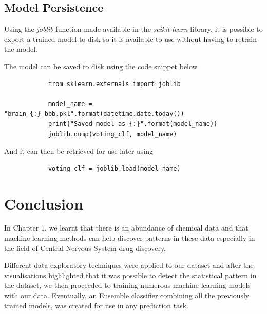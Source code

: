 \documentclass[a4paper,12pt]{report}
\begin{document}
	\section{Model Persistence} 
	Using the \textit{joblib} function made available in the \textit{scikit-learn} library, it is possible to export a trained model to disk so it is available to use without having to retrain the model.
	
	The model can be saved to disk using the code snippet below
		\begin{verbatim}
			from sklearn.externals import joblib

			model_name = "brain_{:}_bbb.pkl".format(datetime.date.today())
			print("Saved model as {:}".format(model_name))
			joblib.dump(voting_clf, model_name) 
		\end{verbatim}
	And it can then be retrieved for use later using
		\begin{verbatim}
			voting_clf = joblib.load(model_name)
		\end{verbatim}
		


\chapter{Conclusion}
	In Chapter 1, we learnt that there is an abundance of chemical data and that machine learning methods can help discover patterns in these data especially in the field of Central Nervous System drug discovery.
	
	Different data exploratory techniques were applied to our dataset and after the visualisations highlighted that it was possible to detect the statistical pattern in the dataset, we then proceeded to training numerous machine learning models with our data. Eventually, an Ensemble classifier combining all the previously trained models, was created for use in any prediction task.
\end{document}
